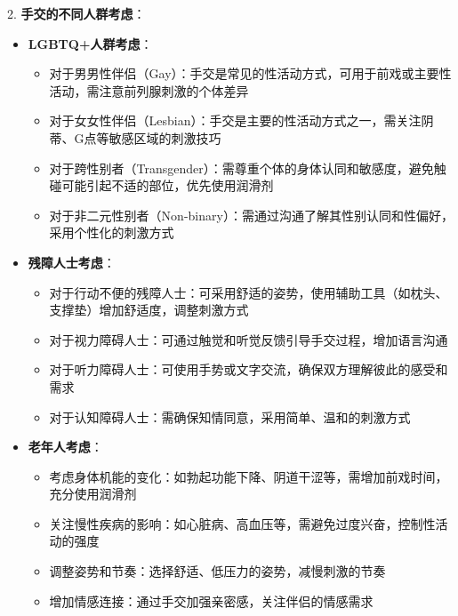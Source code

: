 \documentclass[12pt,UTF8]{ctexbook}
\begin{document}
2. \textbf{手交的不同人群考虑}：
\begin{itemize}
	\item \textbf{LGBTQ+人群考虑}：
	\begin{itemize}
		\item 对于男男性伴侣（Gay）：手交是常见的性活动方式，可用于前戏或主要性活动，需注意前列腺刺激的个体差异
		\item 对于女女性伴侣（Lesbian）：手交是主要的性活动方式之一，需关注阴蒂、G点等敏感区域的刺激技巧
		\item 对于跨性别者（Transgender）：需尊重个体的身体认同和敏感度，避免触碰可能引起不适的部位，优先使用润滑剂
		\item 对于非二元性别者（Non-binary）：需通过沟通了解其性别认同和性偏好，采用个性化的刺激方式
	\end{itemize}
	\item \textbf{残障人士考虑}：
	\begin{itemize}
		\item 对于行动不便的残障人士：可采用舒适的姿势，使用辅助工具（如枕头、支撑垫）增加舒适度，调整刺激方式
		\item 对于视力障碍人士：可通过触觉和听觉反馈引导手交过程，增加语言沟通
		\item 对于听力障碍人士：可使用手势或文字交流，确保双方理解彼此的感受和需求
		\item 对于认知障碍人士：需确保知情同意，采用简单、温和的刺激方式
	\end{itemize}
	\item \textbf{老年人考虑}：
	\begin{itemize}
		\item 考虑身体机能的变化：如勃起功能下降、阴道干涩等，需增加前戏时间，充分使用润滑剂
		\item 关注慢性疾病的影响：如心脏病、高血压等，需避免过度兴奋，控制性活动的强度
		\item 调整姿势和节奏：选择舒适、低压力的姿势，减慢刺激的节奏
		\item 增加情感连接：通过手交加强亲密感，关注伴侣的情感需求
	\end{itemize}
\end{itemize}
\end{document}
